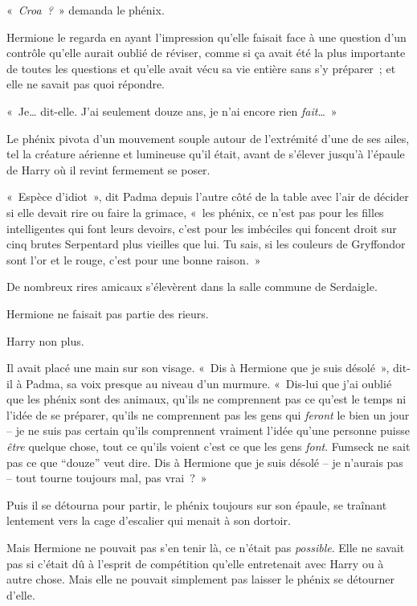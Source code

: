 «~\emph{Croa~?}~» demanda le phénix.

Hermione le regarda en ayant l'impression qu'elle faisait face à une question d'un contrôle qu'elle aurait oublié de réviser, comme si ça avait été la plus importante de toutes les questions et qu'elle avait vécu sa vie entière sans s'y préparer~; et elle ne savait pas quoi répondre.

«~Je… dit-elle. J'ai seulement douze ans, je n'ai encore rien \emph{fait}…~»

Le phénix pivota d'un mouvement souple autour de l'extrémité d'une de ses ailes, tel la créature aérienne et lumineuse qu'il était, avant de s'élever jusqu'à l'épaule de Harry où il revint fermement se poser.

«~Espèce d'idiot~», dit Padma depuis l'autre côté de la table avec l'air de décider si elle devait rire ou faire la grimace, «~les phénix, ce n'est pas pour les filles intelligentes qui font leurs devoirs, c'est pour les imbéciles qui foncent droit sur cinq brutes Serpentard plus vieilles que lui. Tu sais, si les couleurs de Gryffondor sont l'or et le rouge, c'est pour une bonne raison.~»

De nombreux rires amicaux s'élevèrent dans la salle commune de Serdaigle.

Hermione ne faisait pas partie des rieurs.

Harry non plus.

Il avait placé une main sur son visage. «~Dis à Hermione que je suis désolé~», dit-il à Padma, sa voix presque au niveau d'un murmure. «~Dis-lui que j'ai oublié que les phénix sont des animaux, qu'ils ne comprennent pas ce qu'est le temps ni l'idée de se préparer, qu'ils ne comprennent pas les gens qui \emph{feront} le bien un jour -- je ne suis pas certain qu'ils comprennent vraiment l'idée qu'une personne puisse \emph{être} quelque chose, tout ce qu'ils voient c'est ce que les gens \emph{font}. Fumseck ne sait pas ce que “douze” veut dire. Dis à Hermione que je suis désolé -- je n'aurais pas -- tout tourne toujours mal, pas vrai~?~»

Puis il se détourna pour partir, le phénix toujours sur son épaule, se traînant lentement vers la cage d'escalier qui menait à son dortoir.

Mais Hermione ne pouvait pas s'en tenir là, ce n'était pas \emph{possible}. Elle ne savait pas si c'était dû à l'esprit de compétition qu'elle entretenait avec Harry ou à autre chose. Mais elle ne pouvait simplement pas laisser le phénix se détourner d'elle.

